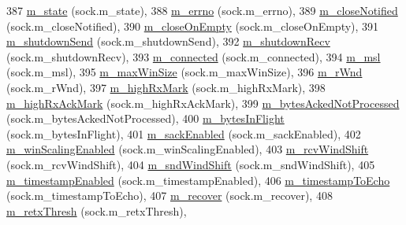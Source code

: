 \begin{DoxyCode}
387     \hyperlink{classns3_1_1TcpSocketBase_a5db6f29272f23546e23320c06a681f3e}{m\_state} (sock.m\_state),
388     \hyperlink{classns3_1_1TcpSocketBase_a592901b6c992843533af1b7c1c7f9474}{m\_errno} (sock.m\_errno),
389     \hyperlink{classns3_1_1TcpSocketBase_a8b9716e924553832a827b6efe214b70f}{m\_closeNotified} (sock.m\_closeNotified),
390     \hyperlink{classns3_1_1TcpSocketBase_a46c12a1d96840292ae2b55c3c2974214}{m\_closeOnEmpty} (sock.m\_closeOnEmpty),
391     \hyperlink{classns3_1_1TcpSocketBase_a443b4ee2b08a845f9429e150d1171a23}{m\_shutdownSend} (sock.m\_shutdownSend),
392     \hyperlink{classns3_1_1TcpSocketBase_a946e6fc03360915a21e089f9cd8cf279}{m\_shutdownRecv} (sock.m\_shutdownRecv),
393     \hyperlink{classns3_1_1TcpSocketBase_aa52df78102ea7c1c6b432ad9486ed0c2}{m\_connected} (sock.m\_connected),
394     \hyperlink{classns3_1_1TcpSocketBase_a668a2cc5cf751511263ee8a0766c9ea5}{m\_msl} (sock.m\_msl),
395     \hyperlink{classns3_1_1TcpSocketBase_a045897aa710b2ad3e99cefd66e8dc168}{m\_maxWinSize} (sock.m\_maxWinSize),
396     \hyperlink{classns3_1_1TcpSocketBase_af3fafd1671964e0674677be541e1501a}{m\_rWnd} (sock.m\_rWnd),
397     \hyperlink{classns3_1_1TcpSocketBase_a9e93feb3fed4ad395da7f3abea173062}{m\_highRxMark} (sock.m\_highRxMark),
398     \hyperlink{classns3_1_1TcpSocketBase_aa53b354456e23b35a97c367e4e03cd97}{m\_highRxAckMark} (sock.m\_highRxAckMark),
399     \hyperlink{classns3_1_1TcpSocketBase_a6224a29116682fbbc66f43bcb114239c}{m\_bytesAckedNotProcessed} (sock.m\_bytesAckedNotProcessed),
400     \hyperlink{classns3_1_1TcpSocketBase_ad7acd30c8700b980142ddd38a52a5401}{m\_bytesInFlight} (sock.m\_bytesInFlight),
401     \hyperlink{classns3_1_1TcpSocketBase_af79c709855a362f331251ef73167209a}{m\_sackEnabled} (sock.m\_sackEnabled),
402     \hyperlink{classns3_1_1TcpSocketBase_a80ff21f228d3334f17dcf56f14fa0c7c}{m\_winScalingEnabled} (sock.m\_winScalingEnabled),
403     \hyperlink{classns3_1_1TcpSocketBase_a045fc4c0c16f906c5ec43d853cdb599f}{m\_rcvWindShift} (sock.m\_rcvWindShift),
404     \hyperlink{classns3_1_1TcpSocketBase_a249576feb9975ab927aeeda274d9bef0}{m\_sndWindShift} (sock.m\_sndWindShift),
405     \hyperlink{classns3_1_1TcpSocketBase_a5a7f7e51b07e27a908d4bab44028eee1}{m\_timestampEnabled} (sock.m\_timestampEnabled),
406     \hyperlink{classns3_1_1TcpSocketBase_ab3fdcb2bbc5e6a064e004e0671875996}{m\_timestampToEcho} (sock.m\_timestampToEcho),
407     \hyperlink{classns3_1_1TcpSocketBase_a176f84edf4bba543e7e3457881f6660f}{m\_recover} (sock.m\_recover),
408     \hyperlink{classns3_1_1TcpSocketBase_aea5678454b966c263c6f72f174e6e328}{m\_retxThresh} (sock.m\_retxThresh),

\end{DoxyCode}
